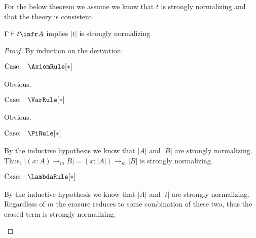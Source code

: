 
For the below theorem we assume we know that $t$ is strongly normalizing and that the theory is consistent.

\begin{theorem}
    $\Gamma \vdash t \infr A$ implies $|t|$ is strongly normalizing
\end{theorem}
\begin{proof}
    By induction on the derivation:

    $\text{Case: }\begin{array}{c} \AxiomRule[*] \end{array}$
    \begin{proofcase}
        Obvious.
    \end{proofcase}

    $\text{Case: }\begin{array}{c} \VarRule[*] \end{array}$
    \begin{proofcase}
        Obvious.
    \end{proofcase}

    $\text{Case: }\begin{array}{c} \PiRule[*] \end{array}$
    \begin{proofcase}
        By the inductive hypothesis we know that $|A|$ and $|B|$ are strongly normalizing.
        Thus, $|(x : A) \to_m B| = (x : |A|) \to_m |B|$ is strongly normalizing.
    \end{proofcase}

    $\text{Case: }\begin{array}{c} \LambdaRule[*] \end{array}$
    \begin{proofcase}
        By the inductive hypothesis we know that $|A|$ and $|t|$ are strongly normalizing.
        Regardless of $m$ the erasure reduces to some combination of these two, thus the erased term is strongly normalizing.
    \end{proofcase}


\end{proof}
